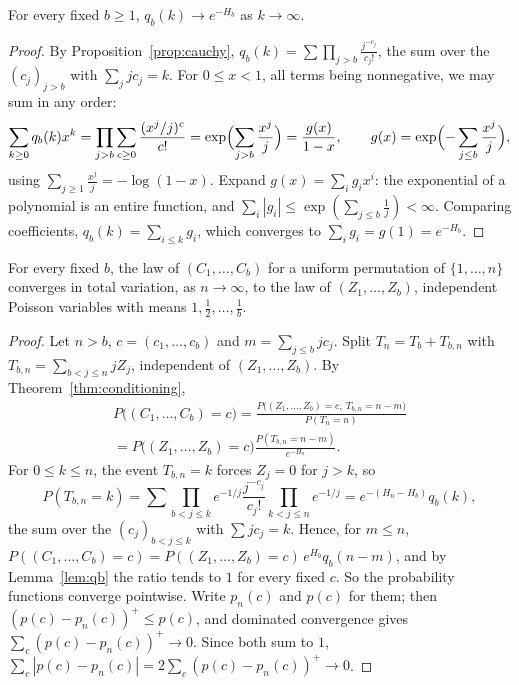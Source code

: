 \begin{lemma}\label{lem:qb}
For every fixed $b\ge1$, $q_b(k)\to e^{-H_b}$ as $k\to\infty$.
\end{lemma}
\begin{proof}
By Proposition~\ref{prop:cauchy}, $q_b(k)=\sum\prod_{j>b}\frac{j^{-c_j}}{c_j!}$, the sum over the $(c_j)_{j>b}$ with $\sum_jjc_j=k$. For $0\le x<1$, all terms being nonnegative, we may sum in any order:
\[
\sum_{k\ge0}q_b(k)x^k=\prod_{j>b}\sum_{c\ge0}\frac{(x^j/j)^c}{c!}=\exp\Bigl(\sum_{j>b}\frac{x^j}j\Bigr)=\frac{g(x)}{1-x},\qquad g(x)=\exp\Bigl(-\sum_{j\le b}\frac{x^j}j\Bigr),
\]
using $\sum_{j\ge1}\frac{x^j}j=-\log(1-x)$. Expand $g(x)=\sum_ig_ix^i$: the exponential of a polynomial is an entire function, and $\sum_i|g_i|\le\exp(\sum_{j\le b}\frac1j)<\infty$. Comparing coefficients, $q_b(k)=\sum_{i\le k}g_i$, which converges to $\sum_ig_i=g(1)=e^{-H_b}$.
\end{proof}

\begin{theorem}\label{thm:smallcycles}
For every fixed $b$, the law of $(C_1,\dots,C_b)$ for a uniform permutation of $\{1,\dots,n\}$ converges in total variation, as $n\to\infty$, to the law of $(Z_1,\dots,Z_b)$, independent Poisson variables with means $1,\frac12,\dots,\frac1b$.
\end{theorem}
\begin{proof}
Let $n>b$, $c=(c_1,\dots,c_b)$ and $m=\sum_{j\le b}jc_j$. Split $T_n=T_b+T_{b,n}$ with $T_{b,n}=\sum_{b<j\le n}jZ_j$, independent of $(Z_1,\dots,Z_b)$. By Theorem~\ref{thm:conditioning},
\[
\begin{gathered}
P\bigl((C_1,\dots,C_b)=c\bigr)=\frac{P\bigl((Z_1,\dots,Z_b)=c,\ T_{b,n}=n-m\bigr)}{P(T_n=n)}\\=P\bigl((Z_1,\dots,Z_b)=c\bigr)\frac{P(T_{b,n}=n-m)}{e^{-H_n}}.
\end{gathered}
\]
For $0\le k\le n$, the event $T_{b,n}=k$ forces $Z_j=0$ for $j>k$, so
\[
P(T_{b,n}=k)=\sum\prod_{b<j\le k}e^{-1/j}\frac{j^{-c_j}}{c_j!}\prod_{k<j\le n}e^{-1/j}=e^{-(H_n-H_b)}q_b(k),
\]
the sum over the $(c_j)_{b<j\le k}$ with $\sum jc_j=k$. Hence, for $m\le n$, $P((C_1,\dots,C_b)=c)=P((Z_1,\dots,Z_b)=c)\,e^{H_b}q_b(n-m)$, and by Lemma~\ref{lem:qb} the ratio tends to $1$ for every fixed $c$. So the probability functions converge
pointwise. Write $p_n(c)$ and $p(c)$ for them; then $(p(c)-p_n(c))^+\le p(c)$, and dominated convergence gives $\sum_c(p(c)-p_n(c))^+\to0$. Since both sum to $1$, $\sum_c|p(c)-p_n(c)|=2\sum_c(p(c)-p_n(c))^+\to0$.
\end{proof}


